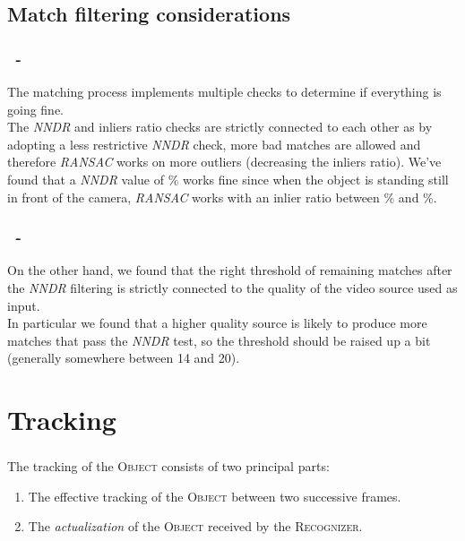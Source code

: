 \documentclass{beamer}
\begin{document}
  \subsection{Match filtering considerations}

  \begin{frame}
	\frametitle{\insertsection\ - \insertsubsection}
	The matching process implements multiple checks to determine if everything
	is going fine.\\
	The \emph{NNDR} and inliers ratio checks are strictly connected to each
    other as by adopting a less restrictive \emph{NNDR} check, more bad matches
    are allowed and therefore \emph{RANSAC} works on more outliers (decreasing
    the inliers ratio).  We've found that a \emph{NNDR} value of \unit[60]{\%}
    works fine since when the object is standing still in front of the camera,
    \emph{RANSAC} works with an inlier ratio between \unit[95]{\%} and
    \unit[100]{\%}.\\
  \end{frame}

  \begin{frame}
  	\frametitle{\insertsection\ - \insertsubsection}
	On the other hand, we found that the right threshold of remaining matches
	after the \emph{NNDR} filtering is strictly connected to the quality of the
    video source used as input.\\
	In particular we found that a higher quality source is likely to produce
	more matches that pass the \emph{NNDR} test, so the threshold should be
    raised up a bit (generally somewhere between 14 and 20).\\
  \end{frame}

  \section{Tracking}

  \begin{frame}
    \frametitle{\insertsection}
    The tracking of the \textsc{Object} consists of two principal parts:
    \begin{enumerate}
      \item The effective tracking of the \textsc{Object} between two
        successive frames.
      \item The \emph{actualization} of the \textsc{Object} received by the
        \textsc{Recognizer}.
    \end{enumerate}
  \end{frame}
\end{document}
